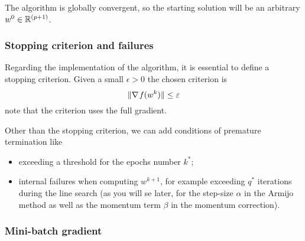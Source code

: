 The algorithm is globally convergent, so the starting solution will be an arbitrary $w^0\in\mathbb{R}^{(p+1)}$.

\subsubsection*{Stopping criterion and failures}

Regarding the implementation of the algorithm, it is essential to define a stopping criterion. Given a small $\epsilon>0$ the chosen criterion is
\begin{equation}\label{eq:stopping}
\lVert\nabla\operatorname*{\mathit{f}}(w^k)\rVert\leq\varepsilon
\end{equation}
note that the criterion uses the full gradient.

Other than the stopping criterion, we can add conditions of premature termination like
\begin{itemize}
\item exceeding a threshold for the epochs number $k^\ast$;%
\item internal failures when computing $w^{k+1}$, for example exceeding $q^\ast$ iterations during the line search (as you will se later, for the step-size $\alpha$ in the Armijo method as well as the momentum term $\beta$ in the momentum correction).
\end{itemize}


\subsubsection*{Mini-batch gradient}

